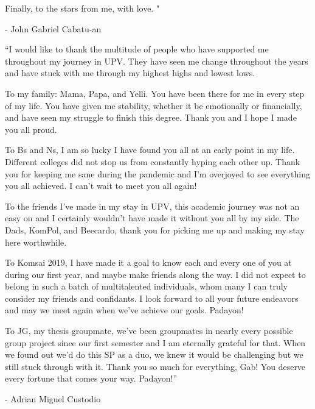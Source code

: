 Finally, to the stars from me, with love. "

- John Gabriel Cabatu-an

“I would like to thank the multitude of people who have supported me throughout my journey in UPV. They have seen me change throughout the years and have stuck with me through my highest highs and lowest lows.

To my family: Mama, Papa, and Yelli. You have been there for me in every step of my life. You have given me stability, whether it be emotionally or financially, and have seen my struggle to finish this degree. Thank you and I hope I made you all proud.

To Bs and Ns, I am so lucky I have found you all at an early point in my life. Different colleges did not stop us from constantly hyping each other up. Thank you for keeping me sane during the pandemic and I’m overjoyed to see everything you all achieved. I can’t wait to meet you all again!

To the friends I’ve made in my stay in UPV, this academic journey was not an easy on and I certainly wouldn’t have made it without you all by my side. The Dads, KomPol, and Beecardo, thank you for picking me up and making my stay here worthwhile. 

To Komsai 2019, I have made it a goal to know each and every one of you at during our first year, and maybe make friends along the way. I did not expect to belong in such a batch of multitalented individuals, whom many I can truly consider my friends and confidants. I look forward to all your future endeavors and may we meet again when we’ve achieve our goals. Padayon!

To JG, my thesis groupmate, we’ve been groupmates in nearly every possible group project since our first semester and I am eternally grateful for that. When we found out we’d do this SP as a duo, we knew it would be challenging but we still stuck through with it. Thank you so much for everything, Gab! You deserve every fortune that comes your way. Padayon!”

- Adrian Miguel Custodio




